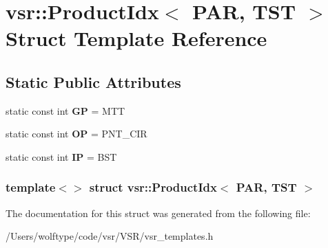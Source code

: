 \hypertarget{structvsr_1_1_product_idx_3_01_p_a_r_00_01_t_s_t_01_4}{\section{vsr\-:\-:Product\-Idx$<$ P\-A\-R, T\-S\-T $>$ Struct Template Reference}
\label{structvsr_1_1_product_idx_3_01_p_a_r_00_01_t_s_t_01_4}
}
\subsection*{Static Public Attributes}
\begin{DoxyCompactItemize}
\item 
\hypertarget{structvsr_1_1_product_idx_3_01_p_a_r_00_01_t_s_t_01_4_ac664b0ed4712d52b79007080ddb5ed08}{static const int {\bfseries G\-P} = M\-T\-T}\label{structvsr_1_1_product_idx_3_01_p_a_r_00_01_t_s_t_01_4_ac664b0ed4712d52b79007080ddb5ed08}

\item 
\hypertarget{structvsr_1_1_product_idx_3_01_p_a_r_00_01_t_s_t_01_4_abd84297c56b9038ab29a9eb5c9ffb66f}{static const int {\bfseries O\-P} = P\-N\-T\-\_\-\-C\-I\-R}\label{structvsr_1_1_product_idx_3_01_p_a_r_00_01_t_s_t_01_4_abd84297c56b9038ab29a9eb5c9ffb66f}

\item 
\hypertarget{structvsr_1_1_product_idx_3_01_p_a_r_00_01_t_s_t_01_4_a2f2ccf5a4b6a4e9e55cb26b332b10a30}{static const int {\bfseries I\-P} = B\-S\-T}\label{structvsr_1_1_product_idx_3_01_p_a_r_00_01_t_s_t_01_4_a2f2ccf5a4b6a4e9e55cb26b332b10a30}

\end{DoxyCompactItemize}
\subsubsection*{template$<$$>$ struct vsr\-::\-Product\-Idx$<$ P\-A\-R, T\-S\-T $>$}



The documentation for this struct was generated from the following file\-:\begin{DoxyCompactItemize}
\item 
/\-Users/wolftype/code/vsr/\-V\-S\-R/vsr\-\_\-templates.\-h\end{DoxyCompactItemize}
